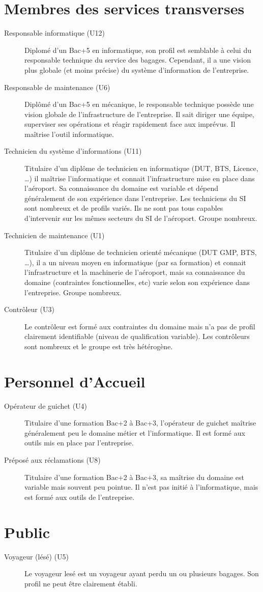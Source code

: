 \section{Membres des services transverses}
\begin{description}
\item[Responsable informatique (U12)] Diplomé d'un Bac+5 en informatique, son
profil est semblable à celui du responsable technique du service des bagages.
Cependant, il a une vision plus globale (et moins précise) du système
d'information de l'entreprise.
\item[Responsable de maintenance (U6)] Diplômé d'un Bac+5 en mécanique, le
responsable technique possède une vision globale de l'infrastructure de
l'entreprise. Il sait diriger une équipe, superviser ses opérations et réagir
rapidement face aux imprévus. Il maîtrise l'outil informatique.
\item[Technicien du système d'informations (U11)] Titulaire d'un diplôme de
technicien en informatique (DUT, BTS, Licence, \ldots) il maîtrise l'informatique et
connait l'infrastructure mise en place dans l'aéroport. Sa connaissance du
domaine est variable et dépend généralement de son expérience dans l'entreprise.
Les techniciens du SI sont nombreux et de profils variés. Ils ne sont pas tous
capables d'intervenir sur les mêmes secteurs du SI de l'aéroport. Groupe
nombreux.
\item[Technicien de maintenance (U1)] Titulaire d'un diplôme de technicien
orienté mécanique (DUT GMP, BTS, \ldots), il a un niveau moyen en informatique (par sa
formation) et connait l'infrastructure et la machinerie de l'aéroport, mais sa
connaissance du domaine (contraintes fonctionnelles, etc) varie selon son
expérience dans l'entreprise. Groupe nombreux. 
\item[Contrôleur (U3)] Le contrôleur est formé aux contraintes du domaine mais
n'a pas de profil clairement identifiable (niveau de qualification variable). Les
contrôleurs sont nombreux et le groupe est très hétérogène.
\end{description}

\section{Personnel d'Accueil}
\begin{description}
\item[Opérateur de guichet (U4)] Titulaire d'une formation Bac+2 à Bac+3,
l'opérateur de guichet maîtrise généralement peu le domaine métier et l'informatique. Il est
formé aux outils mis en place par l'entreprise.
\item[Préposé aux réclamations (U8)] Titulaire d'une formation Bac+2 à Bac+3, sa
maîtrise du domaine est variable mais souvent peu pointue. Il n'est pas initié à
l'informatique, mais est formé aux outils de l'entreprise.
\end{description}

\section{Public}
\begin{description}
\item[Voyageur (lésé) (U5)] Le voyageur lesé est un voyageur ayant perdu un ou
plusieurs bagages. Son profil ne peut être clairement établi.
\end{description}


